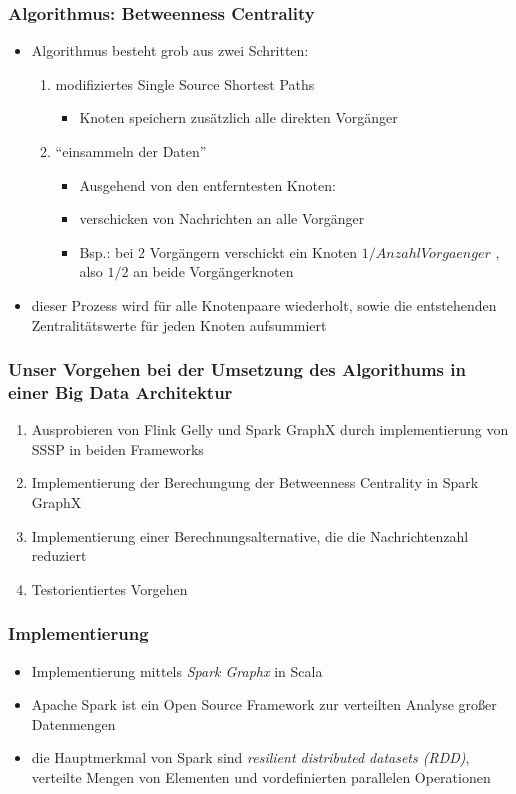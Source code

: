 \documentclass{beamer}
\begin{document}
\begin{frame}
\frametitle{Algorithmus: Betweenness Centrality}
\begin{itemize}
\item Algorithmus besteht grob aus zwei Schritten:
	\begin{enumerate}
	\item modifiziertes Single Source Shortest Paths
		\begin{itemize}
		\item Knoten speichern zusätzlich alle direkten Vorgänger
		\end{itemize}
	\item ``einsammeln der Daten''
		\begin{itemize}
		\item Ausgehend von den entferntesten Knoten:
		\item verschicken von Nachrichten an alle Vorgänger 
		\item Bsp.: bei 2 Vorgängern verschickt ein Knoten \(1  / Anzahl Vorgaenger\) , also \(1/2\) an beide Vorgängerknoten
		\end{itemize}
	\end{enumerate}
\item dieser Prozess wird für alle Knotenpaare wiederholt, sowie die entstehenden Zentralitätswerte für jeden Knoten aufsummiert
\end{itemize}
\end{frame}
\begin{frame}
\frametitle{Unser Vorgehen bei der Umsetzung des Algorithums in einer Big Data Architektur}
\begin{enumerate}
\item Ausprobieren von Flink Gelly und Spark GraphX durch implementierung von SSSP in beiden Frameworks
\item Implementierung der Berechungung der Betweenness Centrality in Spark GraphX
\item Implementierung einer Berechnungsalternative, die die Nachrichtenzahl reduziert
\item Testorientiertes Vorgehen
\end{enumerate}
\end{frame}

\begin{frame}
\frametitle{Implementierung}
\begin{itemize}
\item Implementierung mittels \textit{Spark Graphx} in Scala
\item Apache Spark ist ein Open Source Framework zur verteilten Analyse großer Datenmengen
\item die Hauptmerkmal von Spark sind \textit{resilient distributed datasets (RDD)}, verteilte Mengen von Elementen und vordefinierten parallelen Operationen
\end{itemize}
\end{frame}
\end{document}
